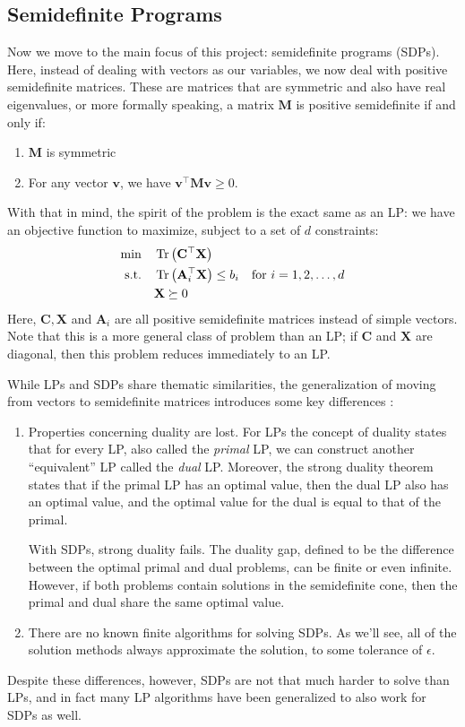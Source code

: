 \documentclass[11pt]{article}
\begin{document}
	\subsection{Semidefinite Programs}
	Now we move to the main focus of this project: semidefinite programs (SDPs). Here, instead of dealing with 
	vectors as our variables, we now deal with positive semidefinite matrices. 
	These are matrices that are symmetric and also have real eigenvalues, or more formally 
	speaking, a matrix \( \mathbf M \) is positive semidefinite if and only if:
	\begin{enumerate}[label=\arabic*.]
		\item \( \mathbf M \) is symmetric
		\item For any vector \( \mathbf v \), we have \( \mathbf v^{\top}\mathbf M \mathbf v \ge 0 \). 
	\end{enumerate}
	With that in mind, the spirit of the problem is the exact same as an LP: we have an objective function to 
	maximize, subject to a set of \( d \) constraints: 
	\begin{align*}
		\min \quad &\Tr \left(\mathbf C^{\top}\mathbf X\right)\\
		\text{s.t.}\quad & \Tr \left(\mathbf A_i^{\top}\mathbf X\right) \le  b_i \quad \text{for \( i = 1, 2, \dots, d \)}\\
						 & \mathbf X \succeq 0
	\end{align*}
	Here, \( \mathbf{C}, \mathbf X \) and \( \mathbf A_i \) are all positive semidefinite matrices instead of simple 
	vectors. Note that this is a more general class of problem than an LP; if \( \mathbf C \) and \( \mathbf X \) are 
	diagonal, then this problem reduces immediately to an LP. 

	While LPs and SDPs share thematic similarities, the generalization of moving from vectors to semidefinite matrices
	introduces some key differences \cite{freundIntroductionSemidefiniteProgramming}:
	\begin{enumerate}[label=\arabic*.]
		\item Properties concerning duality are lost. For LPs the concept of duality states that for every 
			LP, also called the \textit{primal} LP, 
			we can construct another ``equivalent'' LP called the \textit{dual} LP. Moreover, the strong 
			duality theorem states that if the primal LP has an optimal value, then the dual LP also has an optimal 
			value, and the optimal value for the dual is equal to that of the primal.   

			With SDPs, strong duality fails. The duality gap, defined to be the difference between the optimal 
			primal and dual problems, can be finite or even infinite. However, if both problems contain solutions in 
			the semidefinite cone, then the primal and dual share the same optimal value.  
		\item There are no known finite algorithms for solving SDPs. As we'll see, all of the solution methods 
			always approximate the solution, to some tolerance of \( \epsilon \).        
	\end{enumerate}
	Despite these differences, however, SDPs are not that much harder to solve than LPs, and in fact many LP 
	algorithms have been generalized to also work for SDPs as well.  
\end{document}
